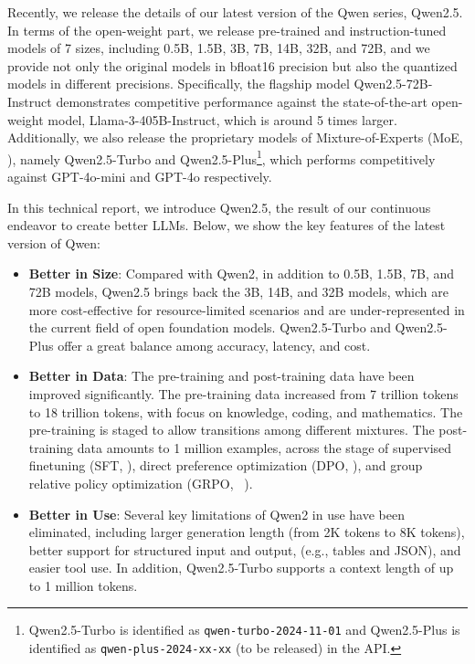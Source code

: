 \documentclass{article}
\begin{document}
Recently, we release the details of our latest version of the Qwen series, Qwen2.5. In terms of the open-weight part, we release pre-trained and instruction-tuned models of 7 sizes, including 0.5B, 1.5B, 3B, 7B, 14B, 32B, and 72B, and we provide not only the original models in bfloat16 precision but also the quantized models in different precisions. Specifically, the flagship model Qwen2.5-72B-Instruct demonstrates competitive performance against the state-of-the-art open-weight model, Llama-3-405B-Instruct, which is around 5 times larger. Additionally, we also release the proprietary models of Mixture-of-Experts (MoE, \citealp{gshard, switch_transformer, stmoe}), namely Qwen2.5-Turbo and Qwen2.5-Plus\footnote{Qwen2.5-Turbo is identified as \texttt{qwen-turbo-2024-11-01} and Qwen2.5-Plus is identified as \texttt{qwen-plus-2024-xx-xx} (to be released) in the API.}, which performs competitively against GPT-4o-mini and GPT-4o respectively. 

In this technical report, we introduce Qwen2.5, the result of our continuous endeavor to create better LLMs. Below, we show the key features of the latest version of Qwen:

\begin{itemize}
    \item \textbf{Better in Size}: Compared with Qwen2, in addition to 0.5B, 1.5B, 7B, and 72B models, Qwen2.5 brings back the 3B, 14B, and 32B models, which are more cost-effective for resource-limited scenarios and are under-represented in the current field of open foundation models. Qwen2.5-Turbo and Qwen2.5-Plus offer a great balance among accuracy, latency, and cost.
    
    \item \textbf{Better in Data}: The pre-training and post-training data have been improved significantly.
    The pre-training data increased from 7 trillion tokens to 18 trillion tokens, with focus on knowledge, coding, and mathematics.
    The pre-training is staged to allow transitions among different mixtures.
    The post-training data amounts to 1 million examples, across the stage of supervised finetuning (SFT, \citealp{instructgpt}), direct preference optimization (DPO, \citealp{rafailov2024direct}), and group relative policy optimization (GRPO, ~\citealp{deepseekmath}).
    
    \item \textbf{Better in Use}: Several key limitations of Qwen2 in use have been eliminated, including larger generation length (from 2K tokens to 8K tokens), better support for structured input and output, (e.g., tables and JSON), and easier tool use. In addition, Qwen2.5-Turbo supports a context length of up to 1 million tokens.
\end{itemize}
\end{document}
